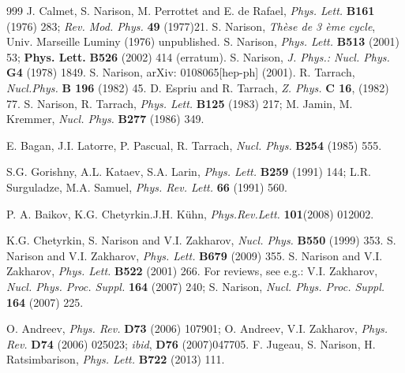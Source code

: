 \begin{thebibliography}{999}
  J. Calmet, S. Narison, M. Perrottet and E. de Rafael, {\it Phys. Lett.} {\bf B161} (1976) 283; {\it Rev. Mod. Phys.} {\bf 49} (1977)21.
  S. Narison, {\it Th\`ese de 3 \`eme cycle}, Univ. Marseille Luminy (1976) unpublished. 
  S. Narison, {\it Phys. Lett.} {\bf B513} (2001) 53;  {\bf Phys. Lett.} {\bf B526} (2002) 414 (erratum).
   S. Narison, {\it J. Phys.: Nucl. Phys.} {\bf G4} (1978) 1849.  
S. Narison, arXiv: 0108065[hep-ph] (2001). 
 R. Tarrach, {\it Nucl.Phys.} {\bf B 196} (1982) 45.
D. Espriu and R. Tarrach, {\it Z. Phys.} {\bf C 16}, (1982) 77.
S. Narison, R. Tarrach, {\it Phys. Lett.} {\bf B125} (1983) 217;
M. Jamin, M. Kremmer, {\it Nucl. Phys.} 
{\bf B277} (1986)  349.

 E. Bagan, J.I. Latorre, P. Pascual, R. Tarrach, {\it Nucl. Phys.} 
{\bf B254} (1985)  555.

 S.G. Gorishny, A.L. Kataev, S.A. Larin, {\it  Phys. Lett.}  {\bf B259} (1991)  144; L.R. Surguladze, M.A. Samuel, {\it  Phys. Rev. Lett.} 
{\bf 66} (1991)  560.

P. A. Baikov, K.G. Chetyrkin.J.H. K\"uhn, {\it Phys.Rev.Lett.} {\bf 101}(2008) 012002. 

 K.G. Chetyrkin, S. Narison and V.I. Zakharov, {\it Nucl. Phys.} 
{\bf B550} (1999)  353.
S. Narison and V.I. Zakharov, {\it Phys. Lett.} {\bf B679} (2009) 355.
S. Narison and V.I. Zakharov, {\it  Phys. Lett.} {\bf B522} (2001) 266.
 For reviews, see e.g.: V.I. Zakharov, {\it Nucl. Phys. Proc. Suppl.} 
{\bf 164} (2007) 240; S. Narison,  {\it Nucl. Phys. Proc. Suppl.} {\bf 164} (2007) 225.

	O. Andreev, {\it Phys. Rev.} {\bf D73} (2006) 107901; 
O. Andreev, V.I. Zakharov,  {\it Phys. Rev.} {\bf D74} (2006) 025023; {\it ibid}, {\bf D76} (2007)047705.
	 F. Jugeau, S. Narison, H. Ratsimbarison,  {\it Phys. Lett.}  {\bf  B722} (2013) 111.


\end{thebibliography}
